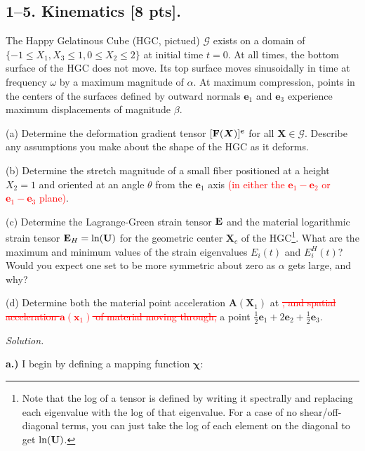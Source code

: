 \bigskip
\subsection*{1--5. \textbf{Kinematics} [8 pts].} The Happy Gelatinous Cube (HGC, pictued) $\mathcal{G}$ exists on a domain of $\{-1\leq X_1 , X_3\leq1, 0\leq X_2 \leq 2\}$ at initial time $t=0$. 
At all times, the bottom surface of the HGC does not move. 
Its top surface moves sinusoidally in time at frequency $\omega$ by a maximum magnitude of $\alpha$. 
At maximum compression, points in the centers of the surfaces defined by outward normals $\bm{e}_1$ and $\bm{e}_3$ experience maximum displacements of magnitude $\beta$. 

\medskip
(a) Determine the deformation gradient tensor $[\mathbf{F}(\bm{X})]^{\bm{e}}$ for all $\bm{X}\in \mathcal{G}$. 
Describe any assumptions you make about the shape of the HGC as it deforms. 

\medskip
(b) Determine the stretch magnitude of a small fiber positioned at a height $X_2 = 1$ and oriented at an angle $\theta$ from the $\bm{e}_1$ axis \textcolor{red}{(in either the $\bm{e}_1- \bm{e}_2$ or $\bm{e}_1- \bm{e}_3$ plane)}. 

\medskip
(c) Determine the Lagrange-Green strain tensor $\mathbf{E}$ and the material logarithmic strain tensor $\mathbf{E}_H = \ln (\mathbf{U})$ for the geometric center $\bm{X}_c$ of the HGC\footnote{Note that the log of a tensor is defined by writing it spectrally and replacing each eigenvalue with the log of that eigenvalue. For a case of no shear/off-diagonal terms, you can just take the log of each element on the diagonal to get $\ln(\mathbf{U})$.}. 
What are the maximum and minimum values of the strain eigenvalues $E_i(t)$ and $E_i^H(t)$? 
Would you expect one set to be more symmetric about zero as $\alpha$ gets large, and why?

\medskip
(d) Determine both the material point acceleration $\bm{A}(\bm{X}_1)$ at \textcolor{red}{\sout{, and spatial acceleration $\bm{a}(\bm{x}_1)$ of material moving through,}} a point $\frac{1}{2} \bm{e}_1 + 2\bm{e}_2 + \frac{1}{2} \bm{e}_3$.  

\begin{figure}
\centering
{}
\end{figure}

\textit{Solution.}

\textbf{a.)} I begin by defining a mapping function $\mathbf{\chi}$:

